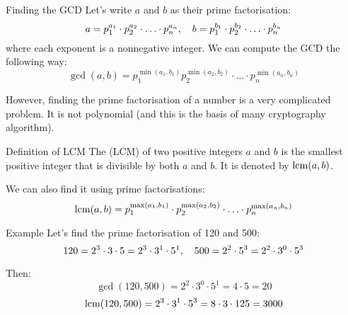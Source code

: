 \documentclass[a4paper]{article}
\begin{document}
\begin{parag}{Finding the GCD}
    Let's write $a$ and $b$ as their prime factorisation: 
    \[a = p_1^{a_1}\cdot p_2^{a_2}\cdot\ldots\cdot p_n^{a_n}, \quad b = p_1^{b_1}\cdot p_2^{b_2}\cdot\ldots\cdot p_n^{b_n}\]
    where each exponent is a nonnegative integer. We can compute the GCD the following way:
    \[\gcd\left(a, b\right) = p_1^{\min\left(a_1, b_1\right)} p_2^{\min\left(a_2, b_2\right)} \cdot\ldots\cdot p_n^{\min\left(a_n, b_n\right)}\]
    
    However, finding the prime factorisation of a number is a very complicated problem. It is not polynomial (and this is the basis of many cryptography algorithm).
\end{parag}

\begin{parag}{Definition of LCM}
    The  (LCM) of two positive integers $a$ and $b$ is the smallest positive integer that is divisible by both $a$ and $b$. It is denoted by $\lcm\left(a, b\right)$.

    We can also find it using prime factorisations: 
    \[\lcm\left(a, b\right) = p_1^{\max\left(a_1, b_1\right)} \cdot p_2^{\max\left(a_2, b_2\right)} \cdot \ldots \cdot p_n^{\max\left(a_n, b_n\right)}\]
\end{parag}

\begin{parag}{Example}
    Let's find the prime factorisation of 120 and 500: 
    \[120 = 2^3 \cdot 3 \cdot 5 = 2^3 \cdot 3^1 \cdot 5^1, \quad 500 = 2^2 \cdot 5^3 = 2^2 \cdot 3^0 \cdot 5^3\]
    
    Then: 
    \[\gcd\left(120, 500\right) = 2^2 \cdot 3^0 \cdot 5^1 = 4\cdot 5 = 20\]
    \[\lcm\left(120, 500\right) = 2^3 \cdot 3^1 \cdot 5^3 = 8\cdot 3\cdot 125 = 3000\]
\end{parag}
\end{document}

